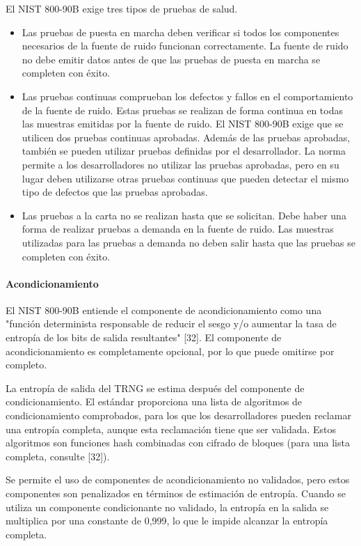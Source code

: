 		El NIST 800-90B exige tres tipos de pruebas de salud.
		
		\begin{itemize}[noitemsep]
			\item Las pruebas de puesta en marcha deben verificar si todos los componentes necesarios de la fuente de ruido funcionan correctamente. La fuente de ruido no debe emitir datos antes de que las pruebas de puesta en marcha se completen con éxito.
			\item Las pruebas continuas comprueban los defectos y fallos en el comportamiento de la fuente de ruido. Estas pruebas se realizan de forma continua en todas las muestras emitidas por la fuente de ruido. El NIST 800-90B exige que se utilicen dos pruebas continuas aprobadas. Además de las pruebas aprobadas, también se pueden utilizar pruebas definidas por el desarrollador. La norma permite a los desarrolladores no utilizar las pruebas aprobadas, pero en su lugar deben utilizarse otras pruebas continuas que pueden detectar el mismo tipo de defectos que las pruebas aprobadas.
			\item Las pruebas a la carta no se realizan hasta que se solicitan. Debe haber una forma de realizar pruebas a demanda en la fuente de ruido. Las muestras utilizadas para las pruebas a demanda no deben salir hasta que las pruebas se completen con éxito.
		\end{itemize}
		
		\paragraph{Acondicionamiento\\}
		
		El NIST 800-90B entiende el componente de acondicionamiento como una "función determinista responsable de reducir el sesgo y/o aumentar la tasa de entropía de los bits de salida resultantes" [32]. El componente de acondicionamiento es completamente opcional, por lo que puede omitirse por completo.
		
		La entropía de salida del TRNG se estima después del componente de condicionamiento. El estándar proporciona una lista de algoritmos de condicionamiento comprobados, para los que los desarrolladores pueden reclamar una entropía completa, aunque esta reclamación tiene que ser validada. Estos algoritmos son funciones hash combinadas con cifrado de bloques (para una lista completa, consulte [32]).
		
		Se permite el uso de componentes de acondicionamiento no validados, pero estos componentes son penalizados en términos de estimación de entropía. Cuando se utiliza un componente condicionante no validado, la entropía en la salida se multiplica por una constante de 0,999, lo que le impide alcanzar la entropía completa.
		
